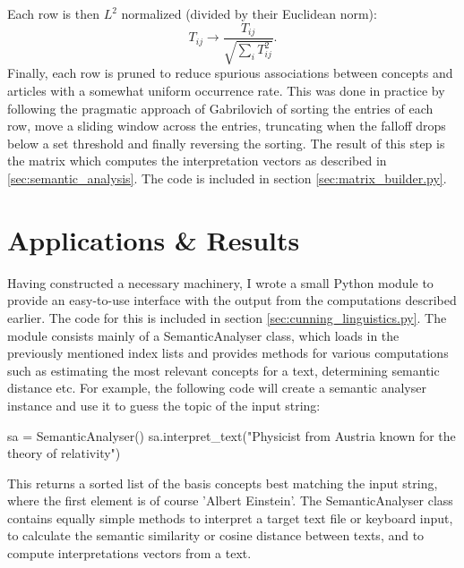Each row is then $L^2$ normalized (divided by their Euclidean norm):
\begin{equation}
	T_{ij} \rightarrow \frac{T_{ij}}{\sqrt{\sum_i T_{ij}^2}}.
\end{equation}
Finally, each row is pruned to reduce spurious associations between concepts and articles with a somewhat uniform occurrence rate. This was done in practice by following the pragmatic approach of Gabrilovich \cite{ESA} of sorting the entries of each row, move a sliding window across the entries, truncating when the falloff drops below a set threshold and finally reversing the sorting.
The result of this step is the matrix which computes the interpretation vectors as described in \ref{sec:semantic_analysis}. The code is included in section \ref{sec:matrix_builder.py}.


\section{Applications \& Results}
\label{sec:esa_results}
Having constructed a necessary machinery, I wrote a small Python module to provide an easy-to-use interface with the output from the computations described earlier. The code for this is included in section \ref{sec:cunning_linguistics.py}. The module consists mainly of a SemanticAnalyser class, which loads in the previously mentioned index lists and provides methods for various computations such as estimating the most relevant concepts for a text, determining semantic distance etc. For example, the following code will create a semantic analyser instance and use it to guess the topic of the input string:
\begin{snippet}[language=python]
	sa = SemanticAnalyser()
	sa.interpret_text("Physicist from Austria known for the theory of relativity")
\end{snippet}
This returns a sorted list of the basis concepts best matching the input string, where the first element is of course 'Albert Einstein'. The SemanticAnalyser class contains equally simple methods to interpret a target text file or keyboard input, to calculate the semantic similarity or cosine distance between texts, and to compute interpretations vectors from a text.

